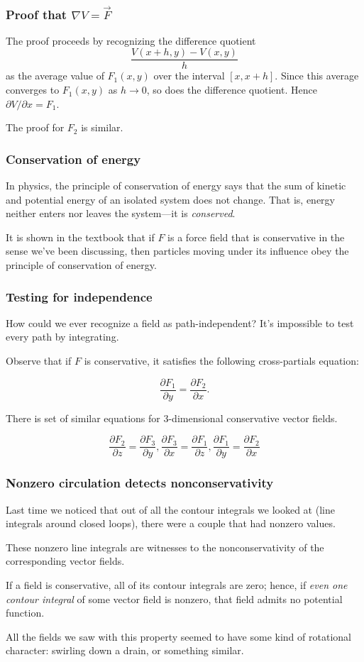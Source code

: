 \documentclass[11pt,ignorenonframetext,aspectratio=169,xcolor={svgnames}]{beamer}
\begin{document}
\begin{frame}\frametitle{Proof that $\nabla V = \vec{F}$}

The proof proceeds by recognizing the difference quotient
\[ \frac{V(x+h,y) - V(x,y)}{h} \] as the average value of $F_1(x,y)$
over the interval $[x,x+h]$. Since this average converges to $F_1(x,y)$
as $h \to 0$, so does the difference quotient. Hence
$\partial V/\partial x = F_1$.

The proof for $F_2$ is similar.

\end{frame}

\begin{frame}\frametitle{Conservation of energy}

In physics, the principle of conservation of energy says that the sum of
kinetic and potential energy of an isolated system does not change. That
is, energy neither enters nor leaves the system---it is
\emph{conserved}.

It is shown in the textbook that if $F$ is a force field that is
conservative in the sense we've been discussing, then particles moving
under its influence obey the principle of conservation of energy.

\end{frame}

\begin{frame}\frametitle{Testing for independence}

How could we ever recognize a field as path-independent? It's impossible
to test every path by integrating.

Observe that if $F$ is conservative, it satisfies the following
cross-partials equation:

\[ \frac{\partial F_1}{\partial y} = \frac{\partial F_2}{\partial x}. \]

There is set of similar equations for 3-dimensional conservative vector
fields.

\[ \frac{\partial F_2}{\partial z} = \frac{\partial F_3}{\partial y}, \frac{\partial F_3}{\partial x} = \frac{\partial F_1}{\partial z}, \frac{\partial F_1}{\partial y} = \frac{\partial F_2}{\partial x} \]

\end{frame}

\begin{frame}\frametitle{Nonzero circulation detects nonconservativity}

Last time we noticed that out of all the contour integrals we looked at
(line integrals around closed loops), there were a couple that had
nonzero values.

These nonzero line integrals are witnesses to the nonconservativity of
the corresponding vector fields.

If a field is conservative, all of its contour integrals are zero;
hence, if \emph{even one contour integral} of some vector field is
nonzero, that field admits no potential function.

All the fields we saw with this property seemed to have some kind of
rotational character: swirling down a drain, or something similar.

\end{frame}
\end{document}
